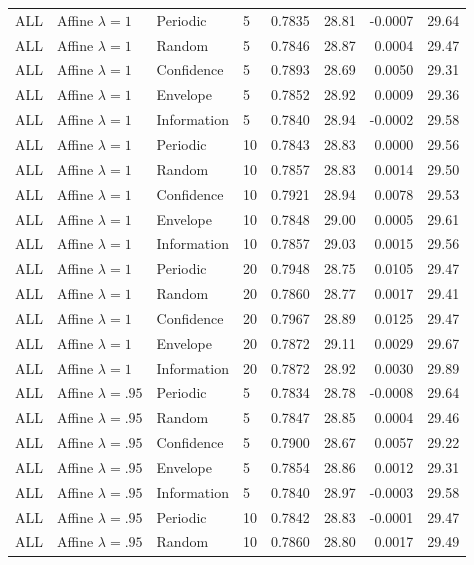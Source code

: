 \begin{longtable}{llllrrrr}
ALL & Affine $\lambda=1$ & Periodic & 5 & 0.7835 & 28.81 & -0.0007 & 29.64 \\
ALL & Affine $\lambda=1$ & Random & 5 & 0.7846 & 28.87 & 0.0004 & 29.47 \\
ALL & Affine $\lambda=1$ & Confidence & 5 & 0.7893 & 28.69 & 0.0050 & 29.31 \\
ALL & Affine $\lambda=1$ & Envelope & 5 & 0.7852 & 28.92 & 0.0009 & 29.36 \\
ALL & Affine $\lambda=1$ & Information & 5 & 0.7840 & 28.94 & -0.0002 & 29.58 \\
ALL & Affine $\lambda=1$ & Periodic & 10 & 0.7843 & 28.83 & 0.0000 & 29.56 \\
ALL & Affine $\lambda=1$ & Random & 10 & 0.7857 & 28.83 & 0.0014 & 29.50 \\
ALL & Affine $\lambda=1$ & Confidence & 10 & 0.7921 & 28.94 & 0.0078 & 29.53 \\
ALL & Affine $\lambda=1$ & Envelope & 10 & 0.7848 & 29.00 & 0.0005 & 29.61 \\
ALL & Affine $\lambda=1$ & Information & 10 & 0.7857 & 29.03 & 0.0015 & 29.56 \\
ALL & Affine $\lambda=1$ & Periodic & 20 & 0.7948 & 28.75 & 0.0105 & 29.47 \\
ALL & Affine $\lambda=1$ & Random & 20 & 0.7860 & 28.77 & 0.0017 & 29.41 \\
ALL & Affine $\lambda=1$ & Confidence & 20 & 0.7967 & 28.89 & 0.0125 & 29.47 \\
ALL & Affine $\lambda=1$ & Envelope & 20 & 0.7872 & 29.11 & 0.0029 & 29.67 \\
ALL & Affine $\lambda=1$ & Information & 20 & 0.7872 & 28.92 & 0.0030 & 29.89 \\
ALL & Affine $\lambda=.95$ & Periodic & 5 & 0.7834 & 28.78 & -0.0008 & 29.64 \\
ALL & Affine $\lambda=.95$ & Random & 5 & 0.7847 & 28.85 & 0.0004 & 29.46 \\
ALL & Affine $\lambda=.95$ & Confidence & 5 & 0.7900 & 28.67 & 0.0057 & 29.22 \\
ALL & Affine $\lambda=.95$ & Envelope & 5 & 0.7854 & 28.86 & 0.0012 & 29.31 \\
ALL & Affine $\lambda=.95$ & Information & 5 & 0.7840 & 28.97 & -0.0003 & 29.58 \\
ALL & Affine $\lambda=.95$ & Periodic & 10 & 0.7842 & 28.83 & -0.0001 & 29.47 \\
ALL & Affine $\lambda=.95$ & Random & 10 & 0.7860 & 28.80 & 0.0017 & 29.49 \\

\end{longtable}
